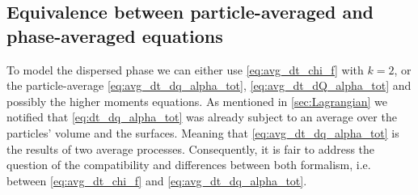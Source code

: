 
\subsection{Equivalence between particle-averaged and phase-averaged equations}
\label{sec:equivalence}
To model the dispersed phase we can either use \ref{eq:avg_dt_chi_f} with $k=2$, or the particle-average \ref{eq:avg_dt_dq_alpha_tot}, \ref{eq:avg_dt_dQ_alpha_tot} and possibly the higher moments equations. 
As mentioned in \ref{sec:Lagrangian} we notified that \ref{eq:dt_dq_alpha_tot} was already subject to an average over the particles' volume and the surfaces. 
Meaning that \ref{eq:avg_dt_dq_alpha_tot} is the results of two average processes. 
Consequently, it is fair to address the question of the compatibility and differences between both formalism, i.e. between \ref{eq:avg_dt_chi_f} and \ref{eq:avg_dt_dq_alpha_tot}. 

